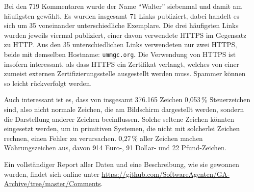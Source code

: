 Bei den 719 Kommentaren wurde der Name \enquote{Walter} siebenmal und damit am
häufigsten gewählt. Es wurden insgesamt 71 Links publiziert, dabei handelt es
sich um 35 voneinander unterschiedliche Exemplare. Die drei häufigsten Links
wurden jeweils viermal publiziert, einer davon verwendete HTTPS im Gegensatz zu
HTTP. Aus den 35 unterschiedlichen Links verwendeten nur zwei HTTPS, beide mit
demselben Hostname: \texttt{ummgc.org}. Die Verwendung von HTTPS ist insofern
interessant, als dass HTTPS ein Zertifikat verlangt, welches von einer zumeist
externen Zertifizierungsstelle ausgestellt werden muss. Spammer können so
leicht rückverfolgt werden.

Auch interessant ist es, dass von insgesamt 376.165 Zeichen 0,053\,\%
Steuerzeichen sind, also nicht normale Zeichen, die am Bildschirm dargestellt
werden, sondern die Darstellung anderer Zeichen beeinflussen. Solche seltene
Zeichen könnten eingesetzt werden, um in primitiven Systemen, die nicht mit
solcherlei Zeichen rechnen, einen Fehler zu verursachen. 0,27\,\% aller Zeichen
machen Währungszeichen aus, davon 914 Euro-, 91 Dollar- und 22 Pfund-Zeichen.

Ein vollständiger Report aller Daten und eine Beschreibung, wie sie gewonnen
wurden, findet sich online unter
\url{https://github.com/SoftwareAgenten/GA-Archive/tree/master/Comments}.
